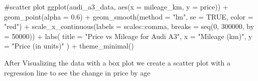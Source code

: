 \documentclass[
  letterpaper,
  DIV=11,
  numbers=noendperiod]{scrartcl}
\newenvironment{Shaded}{\begin{snugshade}}{\end{snugshade}}
\newcommand{\AttributeTok}[1]{\textcolor[rgb]{0.40,0.45,0.13}{#1}}
\newcommand{\CommentTok}[1]{\textcolor[rgb]{0.37,0.37,0.37}{#1}}
\newcommand{\ConstantTok}[1]{\textcolor[rgb]{0.56,0.35,0.01}{#1}}
\newcommand{\DecValTok}[1]{\textcolor[rgb]{0.68,0.00,0.00}{#1}}
\newcommand{\FloatTok}[1]{\textcolor[rgb]{0.68,0.00,0.00}{#1}}
\newcommand{\FunctionTok}[1]{\textcolor[rgb]{0.28,0.35,0.67}{#1}}
\newcommand{\NormalTok}[1]{\textcolor[rgb]{0.00,0.23,0.31}{#1}}
\newcommand{\SpecialCharTok}[1]{\textcolor[rgb]{0.37,0.37,0.37}{#1}}
\newcommand{\StringTok}[1]{\textcolor[rgb]{0.13,0.47,0.30}{#1}}
\begin{document}
\begin{Shaded}
\begin{Highlighting}[]
\CommentTok{\#scatter plot}
\FunctionTok{ggplot}\NormalTok{(audi\_a3\_data, }\FunctionTok{aes}\NormalTok{(}\AttributeTok{x =}\NormalTok{ mileage\_km, }\AttributeTok{y =}\NormalTok{ price)) }\SpecialCharTok{+}
  \FunctionTok{geom\_point}\NormalTok{(}\AttributeTok{alpha =} \FloatTok{0.6}\NormalTok{) }\SpecialCharTok{+}
  \FunctionTok{geom\_smooth}\NormalTok{(}\AttributeTok{method =} \StringTok{"lm"}\NormalTok{, }\AttributeTok{se =} \ConstantTok{TRUE}\NormalTok{, }\AttributeTok{color =} \StringTok{"red"}\NormalTok{) }\SpecialCharTok{+}
  \FunctionTok{scale\_x\_continuous}\NormalTok{(}\AttributeTok{labels =}\NormalTok{ scales}\SpecialCharTok{::}\NormalTok{comma, }\AttributeTok{breaks =} \FunctionTok{seq}\NormalTok{(}\DecValTok{0}\NormalTok{, }\DecValTok{300000}\NormalTok{, }\AttributeTok{by =} \DecValTok{50000}\NormalTok{)) }\SpecialCharTok{+}
  \FunctionTok{labs}\NormalTok{(}
    \AttributeTok{title =} \StringTok{"Price vs Mileage for Audi A3"}\NormalTok{,}
    \AttributeTok{x =} \StringTok{"Mileage (km)"}\NormalTok{,}
    \AttributeTok{y =} \StringTok{"Price (in units)"}
\NormalTok{  ) }\SpecialCharTok{+}
  \FunctionTok{theme\_minimal}\NormalTok{()}
\end{Highlighting}
\end{Shaded}

After Visualizing the data with a box plot we create a scatter plot with
a regression line to see the change in price by age
\end{document}
